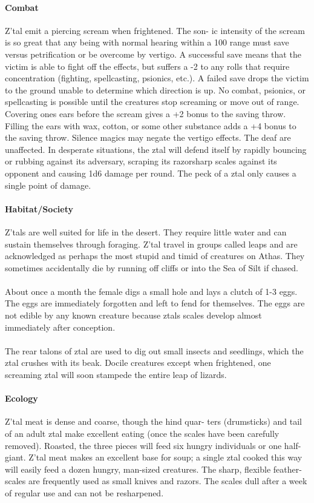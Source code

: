 \paragraph{Combat}
Z'tal emit a piercing scream when frightened. The son-
ic intensity of the scream is so great that any being with normal
hearing within a 100 range must save versus petrification or be
overcome by vertigo. A successful save means that the victim is
able to fight off the effects, but suffers a -2 to any rolls that
require concentration (fighting, spellcasting, psionics, etc.). A
failed save drops the victim to the ground unable to determine
which direction is up. No combat, psionics, or spellcasting is
possible until the creatures stop screaming or move out of
range. Covering ones ears before the scream gives a +2 bonus
to the saving throw. Filling the ears with wax, cotton, or some
other substance adds a +4 bonus to the saving throw. Silence
magics may negate the vertigo effects. The deaf are unaffected.
In desperate situations, the ztal will defend itself by rapidly
bouncing or rubbing against its adversary, scraping its razorsharp
scales against its opponent and causing 1d6 damage per
round. The peck of a ztal only causes a single point of damage.

\paragraph{Habitat/Society}
Z'tals are well suited for life in the desert. They
require little water and can sustain themselves through foraging.
Z'tal travel in groups called leaps and are acknowledged as
perhaps the most stupid and timid of creatures on Athas. They
sometimes accidentally die by running off cliffs or into the Sea
of Silt if chased.\\
\\
About once a month the female digs a small hole and lays a
clutch of 1-3 eggs. The eggs are immediately forgotten and left
to fend for themselves. The eggs are not edible by any known
creature because ztals scales develop almost immediately after
conception.\\
\\
The rear talons of ztal are used to dig out small insects and
seedlings, which the ztal crushes with its beak. Docile creatures
except when frightened, one screaming ztal will soon stampede
the entire leap of lizards.

\paragraph{Ecology}
Z'tal meat is dense and coarse, though the hind quar-
ters (drumsticks) and tail of an adult ztal make excellent eating
(once the scales have been carefully removed). Roasted, the
three pieces will feed six hungry individuals or one half-giant.
Z'tal meat makes an excellent base for soup; a single ztal
cooked this way will easily feed a dozen hungry, man-sized
creatures. The sharp, flexible feather-scales are frequently
used as small knives and razors. The scales dull after a week
of regular use and can not be resharpened.

